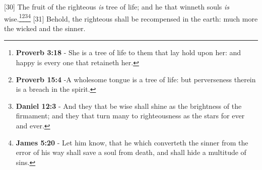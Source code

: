 [30] \textcolor[cmyk]{0.99998,1,0,0}{The fruit of the righteous \emph{is}  tree of life; and he that winneth souls \emph{is} wise.}\footnote{\textbf{Proverb 3:18} - She is a tree of life to them that lay hold upon her: and happy is every one that retaineth her.}\footnote{\textbf{Proverb 15:4} -A wholesome tongue is a tree of life: but perverseness therein is a breach in the spirit.}\footnote{\textbf{Daniel 12:3} - And they that be wise shall shine as the brightness of the firmament; and they that turn many to righteousness as the stars for ever and ever.}\footnote{\textbf{James 5:20} - Let him know, that he which converteth the sinner from the error of his way shall save a soul from death, and shall hide a multitude of sins.}
[31] \textcolor[cmyk]{0.99998,1,0,0}{Behold, the righteous shall be recompensed in the earth: much more the wicked and the sinner.}
